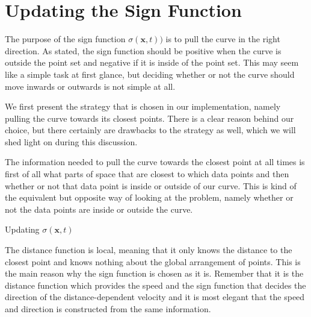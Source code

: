 \section{Updating the Sign Function}
The purpose of the sign function $\sigma(\mathbf{x}, t))$ is to pull the curve in the right direction. As stated, the sign function should be positive when the curve is outside the point set and negative if it is inside of the point set. This may seem like a simple task at first glance, but deciding whether or not the curve should move inwards or outwards is not simple at all.

We first present the strategy that is chosen in our implementation, namely pulling the curve towards its closest points. There is a clear reason behind our choice, but there certainly are drawbacks to the strategy as well, which we will shed light on during this discussion.

The information needed to pull the curve towards the closest point at all times is first of all what parts of space that are closest to which data points and then whether or not that data point is inside or outside of our curve. This is kind of the equivalent but opposite way of looking at the problem, namely whether or not the data points are inside or outside the curve. 


\begin{algorithm}[H]
\SetAlgoLined




 \caption{Updating $\sigma(\mathbf{x}, t)$}
\label{alg:update-sign}
\end{algorithm}



The distance function is local, meaning that it only knows the distance to the closest point and knows nothing about the global arrangement of points. This is the main reason why the sign function is chosen as it is. Remember that it is the distance function which provides the speed and the sign function that decides the direction of the distance-dependent velocity and it is most elegant that the speed and direction is constructed from the same information.

